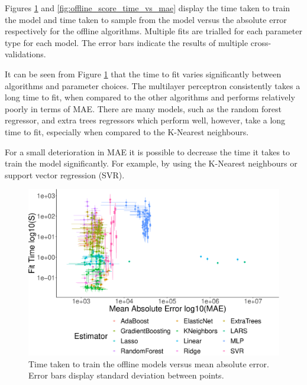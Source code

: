 \documentclass[final,3p,times,twocolumn,numbers]{elsarticle}
\begin{document}
Figures \ref{fig:offline_fit_time_vs_mae} and \ref{fig:offline_score_time_vs_mae} display the time taken to train the model and time taken to sample from the model versus the absolute error respectively for the offline algorithms. Multiple fits are trialled for each parameter type for each model. The error bars indicate the results of multiple cross-validations.

It can be seen from Figure \ref{fig:offline_fit_time_vs_mae} that the time to fit varies significantly between algorithms and parameter choices. The multilayer perceptron consistently takes a long time to fit, when compared to the other algorithms and performs relatively poorly in terms of MAE. There are many models, such as the random forest regressor, and extra trees regressors which perform well, however, take a long time to fit, especially when compared to the K-Nearest neighbours.

For a small deterioration in MAE it is possible to decrease the time it takes to train the model significantly. For example, by using the K-Nearest neighbours or support vector regression (SVR).


\begin{figure}[h]
\centering
\includegraphics[width=\columnwidth]{figures/results/offline_fit_time_vs_mae_all_results_opaque.eps}
\caption{Time taken to train the offline models versus mean absolute error. Error bars display standard deviation between points.}
\label{fig:offline_fit_time_vs_mae}
\end{figure}
\end{document}
